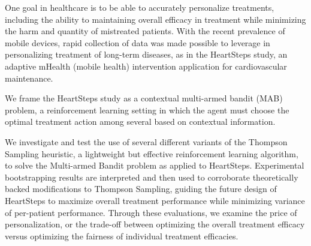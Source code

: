 
One goal in healthcare is to be able to accurately personalize treatments, including the ability to maintaining overall efficacy in treatment while minimizing the harm and quantity of mistreated patients. With the recent prevalence of mobile devices, rapid collection of data was made possible to leverage in personalizing treatment of long-term diseases, as in the HeartSteps study, an adaptive mHealth (mobile health) intervention application for cardiovascular maintenance.

We frame the HeartSteps study as a contextual multi-armed bandit (MAB) problem, a reinforcement learning setting in which the agent must choose the optimal treatment action among several based on contextual information.

We investigate and test the use of several different variants of the Thompson Sampling heuristic, a lightweight but effective reinforcement learning algorithm, to solve the Multi-armed Bandit problem as applied to HeartSteps. Experimental bootstrapping results are interpreted and then used to corroborate theoretically backed modifications to Thompson Sampling, guiding the future design of HeartSteps to maximize overall treatment performance while minimizing variance of per-patient performance. Through these evaluations, we examine the price of personalization, or the trade-off between optimizing the overall treatment efficacy versus optimizing the fairness of individual treatment efficacies.